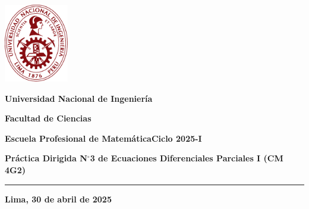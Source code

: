 



\noindent\parbox[c]{.18\textwidth}{\includegraphics[width=2.8cm]{logouni}}\hfill
\parbox[c]{1\textwidth}{\raggedright%
    {\large\textbf{Universidad Nacional de Ingeniería} \par\smallskip}
    {\large\textbf{Facultad de Ciencias} \par\smallskip}
    {\large\textbf{Escuela Profesional de Matemática}\hfil\qquad\qquad\qquad\textbf{Ciclo 2025-I}}
}

\begin{center}\bfseries\large
    Práctica Dirigida N$^{\circ}$3 de Ecuaciones Diferenciales
    Parciales I (CM 4G2)
\end{center}

\vspace{-0.5cm}

\hrulefill
\vspace{-2.5mm}

\rule{16.5cm}{0.8mm}

\begin{questions}
    
\end{questions}

\vfill
\begin{flushright}\bfseries
    Lima, 30 de abril de 2025
\end{flushright}

\clearpage

\appendix



